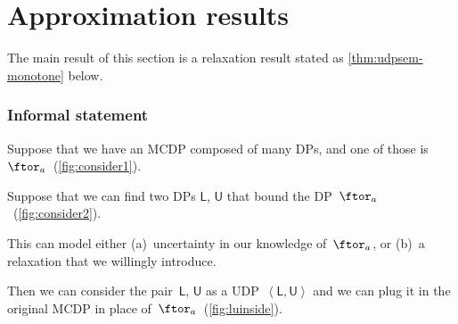 \section{Approximation results\label{sec:Approximation-results}}

The main result of this section is a relaxation result stated as \cref{thm:udpsem-monotone}
below.

\subsubsection*{Informal statement}

Suppose that we have an MCDP composed of many DPs, and one of those
is~$\ftor_{a}$~(\cref{fig:consider1}).


\noindent Suppose that we can find two DPs $\boldsymbol{\mathsf{L}}$,
$\boldsymbol{\mathsf{U}}$ that bound the DP~$\ftor_{a}$~(\cref{fig:consider2}).


\noindent This can model either (a)~uncertainty in our knowledge
of~$\ftor_{a}$, or (b)~a relaxation that we willingly introduce.

\noindent Then we can consider the pair~$\boldsymbol{\mathsf{L}}$,
$\boldsymbol{\mathsf{U}}$ as a UDP~$\left\langle \boldsymbol{\mathsf{L}},\boldsymbol{\mathsf{U}}\right\rangle $
and we can plug it in the original MCDP in place of~$\ftor_{a}$~(\cref{fig:luinside}).
\begin{center}
\end{center}

